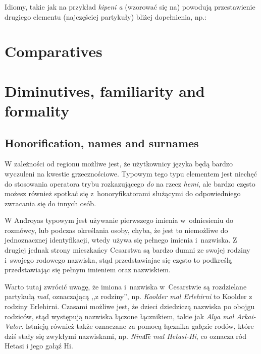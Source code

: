 Idiomy, takie jak na przykład \emph{kipeni a} (wzorować się na) powodują
przestawienie drugiego elementu (najczęściej partykuły) bliżej dopełnienia, np.:



\section{Comparatives}
\label{sec:comparatives}

\section{Diminutives, familiarity and formality}
\label{sec:diminutives}

\subsection{Honorification, names and surnames}

W zależności od regionu możliwe jest, że użytkownicy języka będą bardzo
wyczuleni na kwestie grzecznościowe. Typowym tego typu elementem jest niechęć do
stosowania operatora trybu rozkazującego \emph{do} na rzecz \emph{hemi}, ale
bardzo często możesz również spotkać się z~honoryfikatorami służącymi do
odpowiedniego zwracania się do innych osób.

W And́royas typowym jest używanie pierwszego imienia w~odniesieniu do rozmówcy,
lub podczas określania osoby, chyba, że jest to niemożliwe do jednoznacznej
identyfikacji, wtedy używa się pełnego imienia i~nazwiska. Z drugiej jednak
strony mieszkańcy Cesarstwa są bardzo dumni ze swojej rodziny i~swojego rodowego
nazwiska, stąd przedstawiajac się często to podkreślą przedstawiając się pełnym
imieniem oraz nazwiskiem.


Warto tutaj zwrócić uwagę, że imiona i~nazwiska w~Cesarstwie są rozdzielane
partykułą \emph{mal}, oznaczającą ,,z rodziny'', np. \emph{Koolder mal
    Erlehirni} to Koolder z rodziny Erlehirni. Czasami możliwe jest, że dzieci
dziedziczą nazwiska po obojgu rodziców, stąd występują nazwiska łączone
łącznikiem, takie jak \emph{Alya mal Arkai-Valor}. Istnieją również także
oznaczane za pomocą łącznika gałęzie rodów, które dziś stały się zwykłymi
nazwiskami, np. \emph{Nimu͞e mal Hetasi-Hi}, co oznacza ród Hetasi i jego gałąź
Hi.

